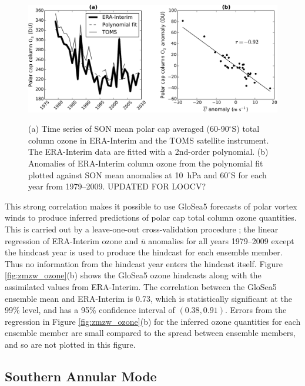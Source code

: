 \begin{figure}[t]
  \noindent\includegraphics[width=\textwidth,angle=0]{figures/chapter-seasonal/zmzw_ozone_scatter_crop.pdf}\\
  \caption[Relation between stratospheric polar vortex strenth and column
  ozone.]{(a) Time series of SON mean polar cap averaged (60-90$^{\circ}$S)
    total column ozone in ERA-Interim and the TOMS satellite instrument. The
    ERA-Interim data are fitted with a 2nd-order polynomial. (b) Anomalies of
    ERA-Interim column ozone from the polynomial fit plotted against SON mean
    anomalies at 10~hPa and 60$^{\circ}$S for each year from 1979--2009. UPDATED
    FOR LOOCV?} \label{fig:zmzw_scatter}
\end{figure}

This strong correlation makes it possible to use GloSea5 forecasts of polar
vortex winds to produce inferred predictions of polar cap total column ozone
quantities. This is carried out by a leave-one-out cross-validation procedure
\citep{Wilks}; the linear regression of ERA-Interim ozone and $\overline{u}$
anomalies for all years 1979--2009 except the hindcast year is used to produce
the hindcast for each ensemble member. Thus no information from the hindcast
year enters the hindcast itself. Figure \ref{fig:zmzw_ozone}(b) shows the
GloSea5 ozone hindcasts along with the assimilated values from ERA-Interim. The
correlation between the GloSea5 ensemble mean and ERA-Interim is 0.73, which is
statistically significant at the 99\% level, and has a 95\% confidence interval
of $(0.38,0.91)$. Errors from the regression in Figure \ref{fig:zmzw_ozone}(b)
for the inferred ozone quantities for each ensemble member are small compared to
the spread between ensemble members, and so are not plotted in this figure.

\subsection{Southern Annular Mode}

